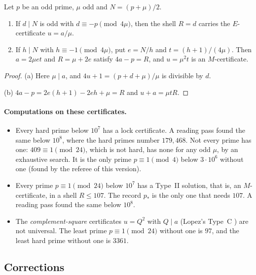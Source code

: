 \begin{proposition}\label{prop:locks}
Let $p$ be an odd prime, $\mu$ odd and $N=(p+\mu)/2$.
\begin{enumerate}[label=(\alph*)]
\item If $d\mid N$ is odd with $d\equiv-p\pmod{4\mu}$, then the shell $R=d$ carries the $E$-certificate $u=a/\mu$.
\item If $h\mid N$ with $h\equiv-1\pmod{4\mu}$, put $e=N/h$ and $t=(h+1)/(4\mu)$. Then $a=2\mu et$ and $R=\mu+2e$ satisfy $4a-p=R$, and $u=\mu^2t$ is an $M$-certificate.
\end{enumerate}
\end{proposition}
\begin{proof}
(a) Here $\mu\mid a$, and $4u+1=(p+d+\mu)/\mu$ is divisible by $d$.

(b) $4a-p=2e(h+1)-2eh+\mu=R$ and $u+a=\mu tR$.
\end{proof}

\paragraph{Computations on these certificates.}
\begin{itemize}
\item Every hard prime below $10^7$ has a lock certificate. A reading pass found the same below $10^8$, where the hard primes number $179{,}468$. Not every prime has one: $409\equiv1\pmod{24}$, which is not hard, has none for any odd $\mu$, by an exhaustive search. It is the only prime $p\equiv1\pmod4$ below $3\cdot10^6$ without one (found by the referee of this version).
\item Every prime $p\equiv1\pmod{24}$ below $10^7$ has a Type~II solution, that is, an $M$-certificate, in a shell $R\le107$. The record $p_*$ is the only one that needs $107$. A reading pass found the same below $10^8$.
\item The \emph{complement-square} certificates $u=Q^2$ with $Q\mid a$ (Lopez's Type~C \cite{Lopez}) are not universal. The least prime $p\equiv1\pmod{24}$ without one is $97$, and the least hard prime without one is $3361$.
\end{itemize}

\subsection{Corrections}\label{ssec:noteserrors}

